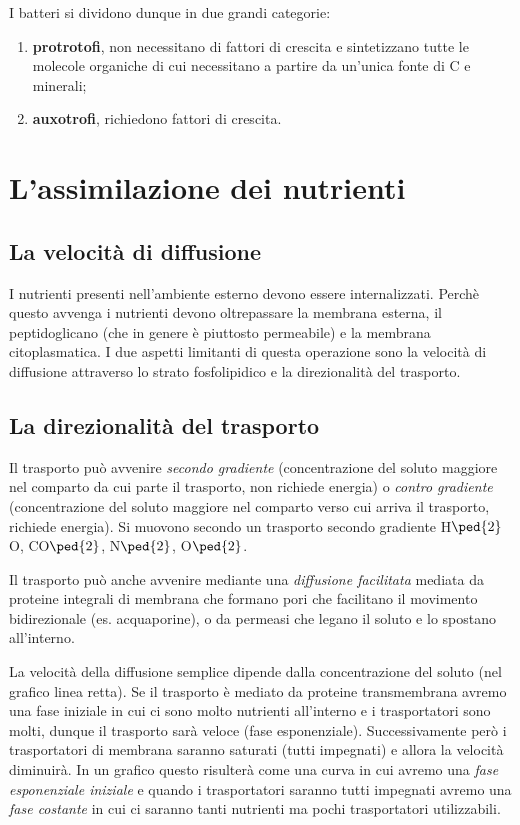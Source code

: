 \documentclass[11pt]{book}
\begin{document}
I batteri si dividono dunque in due grandi categorie:
\begin{enumerate}
\item \textbf{protrotofi}, non necessitano di fattori di crescita e sintetizzano tutte le molecole organiche di cui necessitano a partire da un’unica fonte di C e minerali;
\item \textbf{auxotrofi}, richiedono fattori di crescita.
\end{enumerate}

\section{L'assimilazione dei nutrienti}
\subsection{La velocità di diffusione}
I nutrienti presenti nell’ambiente esterno devono essere internalizzati. Perchè questo avvenga i nutrienti devono oltrepassare la membrana esterna, il peptidoglicano (che in genere è piuttosto permeabile) e la membrana citoplasmatica. I due aspetti limitanti di questa operazione sono la velocità di diffusione attraverso lo strato fosfolipidico e la direzionalità del trasporto.

\subsection{La direzionalità del trasporto}
Il trasporto può avvenire \emph{secondo gradiente} (concentrazione del soluto maggiore nel comparto da cui parte il trasporto, non richiede energia) o \emph{contro gradiente} (concentrazione del soluto maggiore nel comparto verso cui arriva il trasporto, richiede energia).
Si muovono secondo un trasporto secondo gradiente H$\ped{2}$O, CO$\ped{2}$, N$\ped{2}$, O$\ped{2}$.

Il trasporto può anche avvenire mediante una \emph{diffusione facilitata} mediata da proteine integrali di membrana che formano pori che facilitano il movimento bidirezionale (es. acquaporine), o da permeasi che legano il soluto e lo spostano all’interno.

La velocità della diffusione semplice dipende dalla concentrazione del soluto (nel grafico linea retta).
Se il trasporto è mediato da proteine transmembrana avremo una fase iniziale in cui ci sono molto nutrienti all'interno e i trasportatori sono molti, dunque il trasporto sarà veloce (fase esponenziale). Successivamente però i trasportatori di membrana saranno saturati (tutti impegnati) e allora la velocità diminuirà. In un grafico questo risulterà come una curva in cui avremo una \emph{fase esponenziale iniziale} e quando i trasportatori saranno tutti impegnati avremo una \emph{fase costante} in cui ci saranno tanti nutrienti ma pochi trasportatori utilizzabili.
\end{document}
